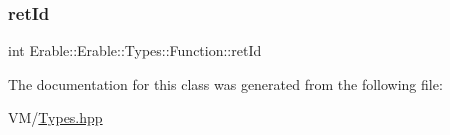 \mbox{\label{class_erable_1_1_erable_1_1_types_1_1_function_a60a53fd4e88e504fbae5ba2a8f19f996}} 
\subsubsection{\texorpdfstring{retId}{retId}}
{\footnotesize\ttfamily int Erable\+::\+Erable\+::\+Types\+::\+Function\+::ret\+Id\hspace{0.3cm}{\ttfamily [private]}}



The documentation for this class was generated from the following file\+:\begin{DoxyCompactItemize}
\item 
V\+M/\mbox{\hyperlink{_types_8hpp}{Types.\+hpp}}\end{DoxyCompactItemize}
